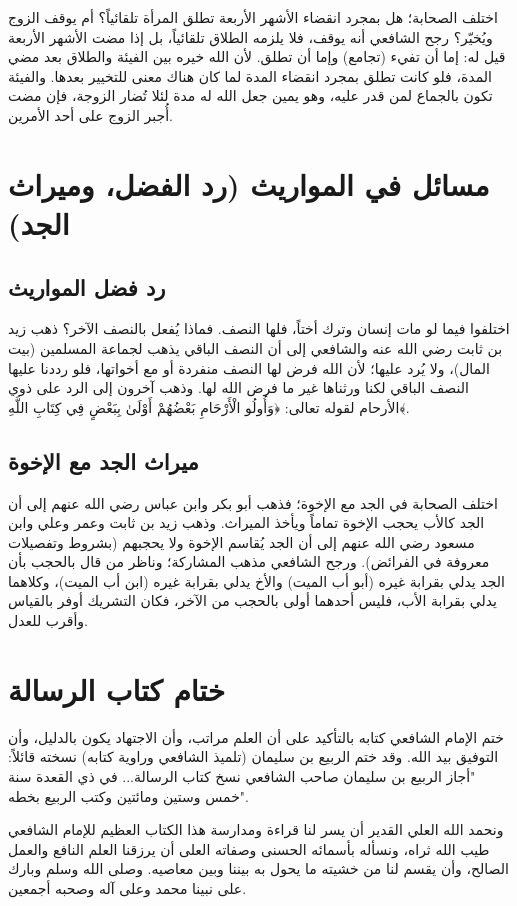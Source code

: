 اختلف الصحابة؛ هل بمجرد انقضاء الأشهر الأربعة تطلق المرأة تلقائياً؟ أم يوقف الزوج ويُخيّر؟
رجح الشافعي أنه يوقف، فلا يلزمه الطلاق تلقائياً، بل إذا مضت الأشهر الأربعة قيل له: إما أن تفيء (تجامع) وإما أن تطلق. لأن الله خيره بين الفيئة والطلاق بعد مضي المدة، فلو كانت تطلق بمجرد انقضاء المدة لما كان هناك معنى للتخيير بعدها. والفيئة تكون بالجماع لمن قدر عليه، وهو يمين جعل الله له مدة لئلا تُضار الزوجة، فإن مضت أُجبر الزوج على أحد الأمرين.

\section{مسائل في المواريث (رد الفضل، وميراث الجد)}

\subsection{رد فضل المواريث}
اختلفوا فيما لو مات إنسان وترك أختاً، فلها النصف. فماذا يُفعل بالنصف الآخر؟
ذهب زيد بن ثابت رضي الله عنه والشافعي إلى أن النصف الباقي يذهب لجماعة المسلمين (بيت المال)، ولا يُرد عليها؛ لأن الله فرض لها النصف منفردة أو مع أخواتها، فلو رددنا عليها النصف الباقي لكنا ورثناها غير ما فرض الله لها. وذهب آخرون إلى الرد على ذوي الأرحام لقوله تعالى: ﴿وَأُولُو الْأَرْحَامِ بَعْضُهُمْ أَوْلَىٰ بِبَعْضٍ فِي كِتَابِ اللَّهِ﴾.

\subsection{ميراث الجد مع الإخوة}
اختلف الصحابة في الجد مع الإخوة؛ فذهب أبو بكر وابن عباس رضي الله عنهم إلى أن الجد كالأب يحجب الإخوة تماماً ويأخذ الميراث. وذهب زيد بن ثابت وعمر وعلي وابن مسعود رضي الله عنهم إلى أن الجد يُقاسم الإخوة ولا يحجبهم (بشروط وتفصيلات معروفة في الفرائض).
ورجح الشافعي مذهب المشاركة؛ وناظر من قال بالحجب بأن الجد يدلي بقرابة غيره (أبو أب الميت) والأخ يدلي بقرابة غيره (ابن أب الميت)، وكلاهما يدلي بقرابة الأب، فليس أحدهما أولى بالحجب من الآخر، فكان التشريك أوفر بالقياس وأقرب للعدل.

\section{ختام كتاب الرسالة}
ختم الإمام الشافعي كتابه بالتأكيد على أن العلم مراتب، وأن الاجتهاد يكون بالدليل، وأن التوفيق بيد الله.
وقد ختم الربيع بن سليمان (تلميذ الشافعي وراوية كتابه) نسخته قائلاً: "أجاز الربيع بن سليمان صاحب الشافعي نسخ كتاب الرسالة... في ذي القعدة سنة خمس وستين ومائتين وكتب الربيع بخطه".

ونحمد الله العلي القدير أن يسر لنا قراءة ومدارسة هذا الكتاب العظيم للإمام الشافعي طيب الله ثراه، ونسأله بأسمائه الحسنى وصفاته العلى أن يرزقنا العلم النافع والعمل الصالح، وأن يقسم لنا من خشيته ما يحول به بيننا وبين معاصيه. وصلى الله وسلم وبارك على نبينا محمد وعلى آله وصحبه أجمعين.